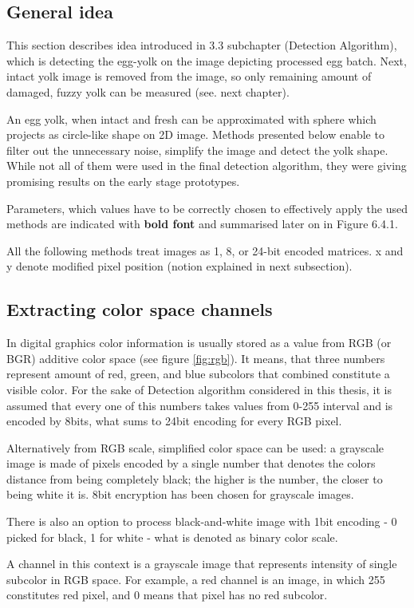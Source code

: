 \documentclass[12pt,twoside,a4paper]{article}
\begin{document}
\subsection{General idea}
This section describes idea introduced in 3.3 subchapter (Detection Algorithm), which is detecting the egg-yolk on the image depicting processed egg batch.
Next, intact yolk image is removed from the image, so only remaining amount of damaged, fuzzy yolk can be measured (see. next chapter).

An egg yolk, when intact and fresh can be approximated with sphere which projects as circle-like shape on 2D image.
Methods presented below enable to filter out the unnecessary noise, simplify the image and detect the yolk shape.
While not all of them were used in the final detection algorithm, they were giving promising results on the early stage prototypes.

Parameters, which values have to be correctly chosen to effectively apply the used methods are indicated with \textbf{bold font} and summarised later on in Figure 6.4.1.

All the following methods treat images as 1, 8, or 24-bit encoded matrices. x and y denote modified pixel position (notion explained in next subsection).
\subsection{Extracting color space channels}
In digital graphics color information is usually stored as a value from RGB (or BGR) additive color space (see figure \ref{fig:rgb}).
It means, that three numbers represent amount of red, green, and blue subcolors that combined constitute a visible color.
For the sake of Detection algorithm considered in this thesis, it is assumed that every one of this numbers takes values from 0-255 interval and is encoded by 8bits, what sums to 24bit encoding for every RGB pixel.

Alternatively from RGB scale, simplified color space can be used: a grayscale image is made of pixels encoded by a single number that denotes the colors distance from being completely black; the higher is the number, the closer to being white it is.
8bit encryption has been chosen for grayscale images.

There is also an option to process black-and-white image with 1bit encoding - 0 picked for black, 1 for white - what is denoted as binary color scale.
 
A channel in this context is a grayscale image that represents intensity of single subcolor in RGB space. 
For example, a red channel is an image, in which 255 constitutes red pixel, and 0 means that pixel has no red subcolor.
\end{document}
